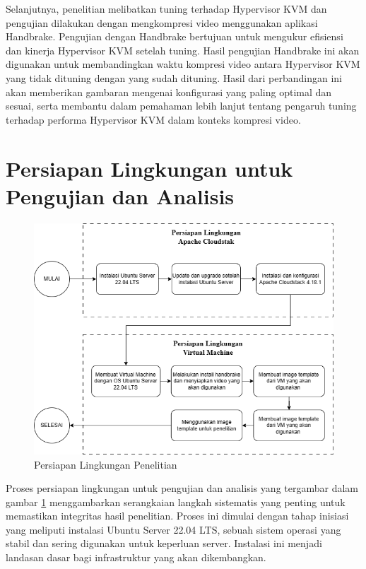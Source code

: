 Selanjutnya, penelitian melibatkan tuning terhadap Hypervisor KVM dan pengujian dilakukan dengan mengkompresi video menggunakan aplikasi Handbrake. Pengujian dengan Handbrake bertujuan untuk mengukur efisiensi dan kinerja Hypervisor KVM setelah tuning. Hasil pengujian Handbrake ini akan digunakan untuk membandingkan waktu kompresi video antara Hypervisor KVM yang tidak dituning dengan yang sudah dituning. Hasil dari perbandingan ini akan memberikan gambaran mengenai konfigurasi yang paling optimal dan sesuai, serta membantu dalam pemahaman lebih lanjut tentang pengaruh tuning terhadap performa Hypervisor KVM dalam konteks kompresi video.

\section{Persiapan Lingkungan untuk Pengujian dan Analisis}
\begin{figure}
    \centering
    \includegraphics[width=1\textwidth]
    {assets/pics/persiapan_lingkungan_penelitian.png}
    \caption{Persiapan Lingkungan Penelitian}
    \label{fig:PersiapanLingkunganPenelitian}
\end{figure}


Proses persiapan lingkungan untuk pengujian dan analisis yang tergambar dalam gambar \ref{fig:PersiapanLingkunganPenelitian} menggambarkan serangkaian langkah sistematis yang penting untuk memastikan integritas hasil penelitian. Proses ini dimulai dengan tahap inisiasi yang meliputi instalasi Ubuntu Server 22.04 LTS, sebuah sistem operasi yang stabil dan sering digunakan untuk keperluan server. Instalasi ini menjadi landasan dasar bagi infrastruktur yang akan dikembangkan.

